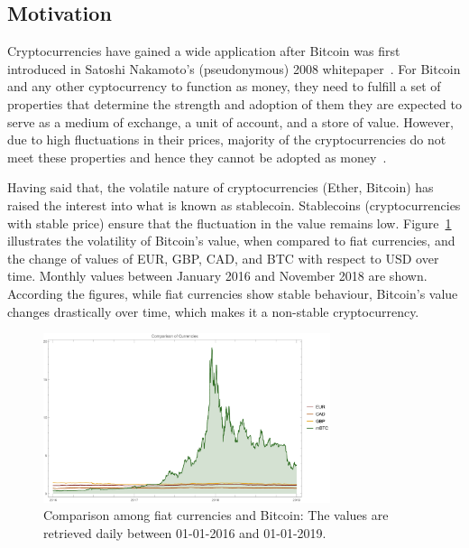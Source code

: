 
\subsection{Motivation} %
Cryptocurrencies have gained a wide application after Bitcoin was first introduced in Satoshi Nakamoto’s (pseudonymous) 2008 whitepaper~\cite{nakamoto2008bitcoin}. For Bitcoin and any other cyptocurrency to function as money, they need to fulfill a set of properties that determine the strength and adoption of them \ie they are expected to serve as a medium of exchange, a unit of account, and a store of value. However, due to high fluctuations in their prices, majority of the cryptocurrencies do not meet these properties and hence they cannot be adopted as money~\cite{overview}.

Having said that, the volatile nature of cryptocurrencies (\eg Ether, Bitcoin) has raised the interest into what is known as stablecoin. Stablecoins (\ie cryptocurrencies with stable price) ensure that the fluctuation in the value remains low. Figure~\ref{fig:btcandfiat} illustrates the volatility of Bitcoin's value, when compared to fiat currencies, and the change of values of EUR, GBP, CAD, and BTC with respect to USD over time. Monthly values between January 2016 and November 2018 are shown. According the figures, while fiat currencies show stable behaviour, Bitcoin's value changes drastically over time, which makes it a non-stable cryptocurrency.

\begin{figure}[!htb]
	\centering
	\includegraphics[width=0.75\textwidth]{figures/allCurrencies.pdf}
	\caption{\label{fig:btcandfiat}Comparison among fiat currencies and Bitcoin: The values are retrieved daily between  01-01-2016 and  01-01-2019.}
\end{figure}


